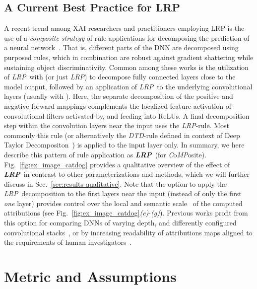 \documentclass[conference]{IEEEtran}
\newcommand{\lrpz}[0]{\emph{LRP}}
\newcommand{\lrpeps}[0]{\emph{LRP}}
\newcommand{\lrpalphabeta}[0]{\emph{LRP}}
\newcommand{\lrpflat}[0]{\emph{LRP}}
\newcommand{\lrpzb}[0]{\emph{DTD}}
\newcommand{\lrpcnn}[0]{\emph{LRP}}
\newcommand{\LRPCMP}[0]{\textbf{\lrpcnn}}
\begin{document}
\subsection{A Current Best Practice for LRP}

A recent trend among XAI researchers and practitioners employing LRP is the use of a \emph{composite strategy} of rule applications for decomposing the prediction of a neural network~\cite{lapuschkin2017understanding,montavon2019layer,lapuschkin2019unmasking,hagele2019resolving,hui2019batchnorm}. That is, different parts of the DNN are decomposed using purposed rules, which in combination are robust against gradient shattering while sustaining object discriminativity.
Common among these works is the utilization of \lrpeps~with   (or just \lrpz) to decompose fully connected layers close to the model output,
followed by an application of \lrpalphabeta~to the underlying convolutional layers (usually with ).
Here, the separate decomposition of the positive and negative forward mappings complements the localized feature activation of convolutional filters activated by, and feeding into ReLUs.
A final decomposition step within the convolution layers near the input uses the \lrpflat-rule.
Most commonly this rule (or alternatively the \lrpzb-rule defined in context of Deep Taylor Decompositon~\cite{montavon2017explaining}) is applied to the input layer only.
In summary, we here describe this pattern of rule application as \LRPCMP~(for \emph{C}o\emph{MP}osite).
Fig.~\ref{fig:ex_image_catdog} provides a qualitative overview of the effect of \LRPCMP~in contrast to other parameterizations and methods, which we will further discuss in Sec.~\ref{sec:results-qualitative}.
Note that the option to apply the \lrpflat~decomposition to the first  layers near the input (instead of only the first \emph{one} layer) provides control over the local and semantic scale~\cite{bach2016controlling} of the computed attributions (see Fig.~\ref{fig:ex_image_catdog}\emph{(e)}-\emph{(g)}).
Previous works profit from this option for comparing DNNs of varying depth, and differently configured convolutional stacks~\cite{lapuschkin2017understanding}, or by increasing readability of attributions maps aligned to the requirements of human investigators~\cite{hagele2019resolving}.

\section{Metric and Assumptions}
\end{document}

